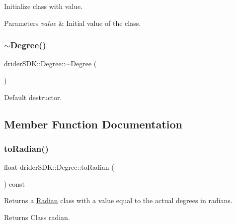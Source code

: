 Initialize class with value.


\begin{DoxyParams}{Parameters}
{\em value} & Initial value of the class. \\
\hline
\end{DoxyParams}
\mbox{\label{classdrider_s_d_k_1_1_degree_a44a8904fbd4178de2916c2b54883c1e1}} 
\subsubsection{\texorpdfstring{$\sim$\+Degree()}{~Degree()}}
{\footnotesize\ttfamily drider\+S\+D\+K\+::\+Degree\+::$\sim$\+Degree (\begin{DoxyParamCaption}{ }\end{DoxyParamCaption})}

Default destructor. 

\subsection{Member Function Documentation}
\mbox{\label{classdrider_s_d_k_1_1_degree_a5904a76d6c28c10ca432ee46db1997a8}} 
\subsubsection{\texorpdfstring{to\+Radian()}{toRadian()}}
{\footnotesize\ttfamily float drider\+S\+D\+K\+::\+Degree\+::to\+Radian (\begin{DoxyParamCaption}{ }\end{DoxyParamCaption}) const}

Returns a \hyperlink{classdrider_s_d_k_1_1_radian}{Radian} class with a value equal to the actual degrees in radians.

\begin{DoxyReturn}{Returns}
Class radian. 
\end{DoxyReturn}
\mbox{\label{classdrider_s_d_k_1_1_degree_a5f35502afbc09417969d83f2381cc59f}} 

